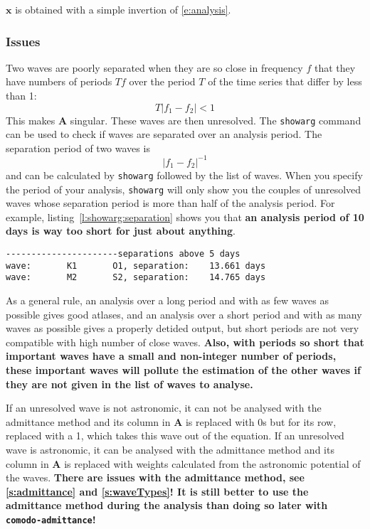 \documentclass[11pt]{article} %
\providecommand{\abs}[1]{\left| #1 \right|}
\providecommand{\m}[1]{\mathbf{#1}}
\providecommand{\code}[1]{\hbox{\lstinline|#1|}}
\newcommand{\lref}[1]{listing~\ref{#1}}
\providecommand{\admittanceWarning}{There are issues with the admittance method, see \ref{s:admittance} and \ref{s:waveTypes}!}
\begin{document}
\begin{multicols}{2}
$\m{x}$ is obtained with a simple invertion of \eqref{e:analysis}.

\subsubsection{Issues}

Two waves are poorly separated when they are so close in frequency $f$ that they have numbers of periods $Tf$ over the period $T$ of the time series that differ by less than 1:
$$T\abs{f_1-f_2}<1$$
This makes $\m{A}$ singular.
These waves are then unresolved.
The \code{showarg} command can be used to check if waves are separated over an analysis period.
The separation period of two waves is
$$\abs{f_1-f_2}^{-1}$$
and can be calculated by \code{showarg} followed by the list of waves.
When you specify the period of your analysis, \code{showarg} will only show you the couples of unresolved waves whose separation period is more than half of the analysis period.
For example, \lref{l:showarg:separation} shows you that
  {\bfseries an analysis period of 10 days is way too short for just about anything}.
\begin{lstlisting}[caption=extract of the output of \\ \code{showarg -s 01/01/2012 -f 11/01/2012 K1 O1 M2 S2},label=l:showarg:separation]
----------------------separations above 5 days
wave:       K1       O1, separation:    13.661 days 
wave:       M2       S2, separation:    14.765 days 
\end{lstlisting}

As a general rule,
  an analysis over a long period and with as few waves as possible gives good atlases, and
  an analysis over a short period and with as many waves as possible gives a properly detided output,
  but short periods are not very compatible with high number of close waves.
{\bfseries
Also, with periods so short that important waves have a small and non-integer number of periods, these important waves will pollute the estimation of the other waves if they are not given in the list of waves to analyse.
}

If an unresolved wave is not astronomic, it can not be analysed with the admittance method and its column in $\m{A}$ is replaced with 0s but for its row, replaced with a 1, which takes this wave out of the equation.
If an unresolved wave is astronomic, it can be analysed with the admittance method and its column in $\m{A}$ is replaced with weights calculated from the astronomic potential of the waves.
{\bfseries
\admittanceWarning{}
It is still better to use the admittance method during the analysis than doing so later with \code{comodo-admittance}!
}


\end{multicols}
\end{document}
